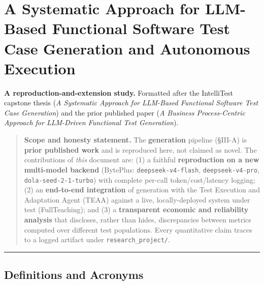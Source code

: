 \documentclass[
]{article}
\author{}
\date{}
\begin{document}
{
\setcounter{tocdepth}{3}
\tableofcontents
}
\section{A Systematic Approach for LLM-Based Functional Software Test
Case Generation and Autonomous
Execution}\label{a-systematic-approach-for-llm-based-functional-software-test-case-generation-and-autonomous-execution}

\textbf{A reproduction-and-extension study.} Formatted after the
IntelliTest capstone thesis (\emph{A Systematic Approach for LLM-Based
Functional Software Test Case Generation}) and the prior published paper
(\emph{A Business Process-Centric Approach for LLM-Driven Functional
Test Generation}).

\begin{quote}
\textbf{Scope and honesty statement.} The \textbf{generation} pipeline
(§III-A) is \textbf{prior published work} and is reproduced here, not
claimed as novel. The contributions of \emph{this} document are: (1) a
faithful \textbf{reproduction on a new multi-model backend} (BytePlus:
\texttt{deepseek-v4-flash}, \texttt{deepseek-v4-pro},
\texttt{dola-seed-2-1-turbo}) with complete per-call token/cost/latency
logging; (2) an \textbf{end-to-end integration} of generation with the
Test Execution and Adaptation Agent (TEAA) against a live,
locally-deployed system under test (FullTeaching); and (3) a
\textbf{transparent economic and reliability analysis} that discloses,
rather than hides, discrepancies between metrics computed over different
test populations. Every quantitative claim traces to a logged artifact
under \texttt{research\_project/}.
\end{quote}

\begin{center}\rule{0.5\linewidth}{0.5pt}\end{center}

\subsection{Definitions and Acronyms}\label{definitions-and-acronyms}
\end{document}
